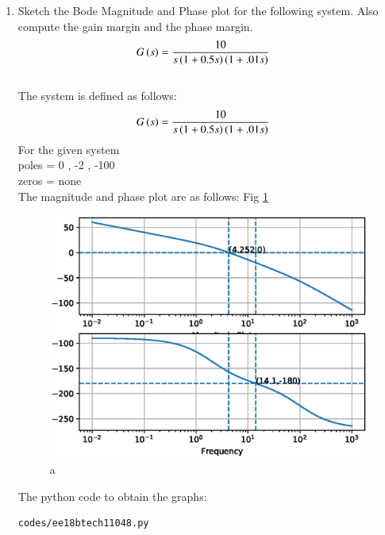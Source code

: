 \begin{enumerate}[label=\thesection.\arabic*.,ref=\thesection.\theenumi]

\item Sketch the Bode Magnitude and Phase plot for the following system. Also compute the gain margin and the phase margin.
\begin{align}
G\left(s\right) &= \frac{10}{s\left(1+0.5s\right)\left(1+.01s\right)}
\label{eq:ee18btech11048_2}
\end{align}
\\
\solution 
The system is defined as follows:
\begin{align}
G\left(s\right) &= \frac{10}{s\left(1+0.5s\right)\left(1+.01s\right)}
\end{align}
For the given system\\
poles = 0 , -2 , -100\\
zeros = none\\
The magnitude and phase plot are as follows: Fig  \ref{fig:ee18btech11048} 
\begin{figure}[!h]
\centering
  \includegraphics[width=\columnwidth]{./figs/ee18btech11048.eps}
  \caption{a}
  \label{fig:ee18btech11048}
\end{figure}

The python code to obtain the graphs:

\begin{lstlisting}
codes/ee18btech11048.py
\end{lstlisting}


\end{enumerate}
